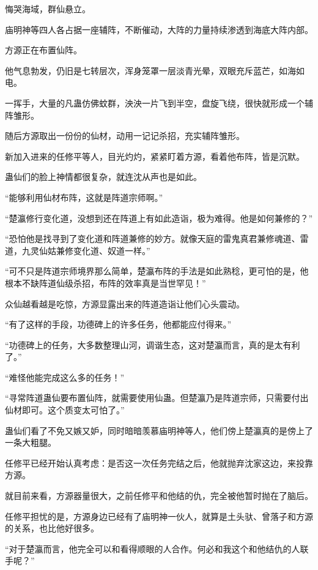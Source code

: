
\begin{this_body}

悔哭海域，群仙悬立。

庙明神等四人各占据一座辅阵，不断催动，大阵的力量持续渗透到海底大阵内部。

方源正在布置仙阵。

他气息勃发，仍旧是七转层次，浑身笼罩一层淡青光晕，双眼充斥蓝芒，如海如电。

一挥手，大量的凡蛊仿佛蚊群，泱泱一片飞到半空，盘旋飞绕，很快就形成一个辅阵雏形。

随后方源取出一份份的仙材，动用一记记杀招，充实辅阵雏形。

新加入进来的任修平等人，目光灼灼，紧紧盯着方源，看着他布阵，皆是沉默。

蛊仙们的脸上神情都很复杂，就连沈从声也是如此。

“能够利用仙材布阵，这就是阵道宗师啊。”

“楚瀛修行变化道，没想到还在阵道上有如此造诣，极为难得。他是如何兼修的？”

“恐怕他是找寻到了变化道和阵道兼修的妙方。就像天庭的雷鬼真君兼修魂道、雷道，九灵仙姑兼修变化道、奴道一样。”

“可不只是阵道宗师境界那么简单，楚瀛布阵的手法是如此熟稔，更可怕的是，他根本不缺阵道仙级杀招，布阵的效率真是当世罕见！”

众仙越看越是吃惊，方源显露出来的阵道造诣让他们心头震动。

“有了这样的手段，功德碑上的许多任务，他都能应付得来。”

“功德碑上的任务，大多数整理山河，调谐生态，这对楚瀛而言，真的是太有利了。”

“难怪他能完成这么多的任务！”

“寻常阵道蛊仙要布置仙阵，就需要使用仙蛊。但楚瀛乃是阵道宗师，只需要付出仙材即可。这个质变太可怕了。”

蛊仙们看了不免又嫉又妒，同时暗暗羡慕庙明神等人，他们傍上楚瀛真的是傍上了一条大粗腿。

任修平已经开始认真考虑：是否这一次任务完结之后，他就抛弃沈家这边，来投靠方源。

就目前来看，方源器量很大，之前任修平和他结的仇，完全被他暂时抛在了脑后。

任修平担忧的是，方源身边已经有了庙明神一伙人，就算是土头驮、曾落子和方源的关系，也比他好很多。

“对于楚瀛而言，他完全可以和看得顺眼的人合作。何必和我这个和他结仇的人联手呢？”


\end{this_body}
